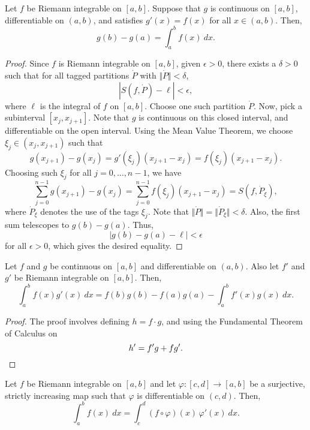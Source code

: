 \documentclass[11pt]{article}
\theoremstyle{definition}
\theoremstyle{remark}
\numberwithin{equation}{module}
\begin{document}
    \begin{theorem}
        Let $f$ be Riemann integrable on $[a, b]$. Suppose that $g$ is continuous on
        $[a, b]$, differentiable on $(a, b)$, and satisfies $g'(x) = f(x)$ for all
        $x \in (a, b)$. Then, \[
            g(b) - g(a) = \int_a^b f(x)\:dx.
        \] 
    \end{theorem}
    \begin{proof}
        Since $f$ is Riemann integrable on $[a, b]$, given $\epsilon > 0$, there
        exists a $\delta > 0$ such that for all tagged partitions $\dot{P}$ with
        $\Vert\dot{P}\Vert < \delta$, \[
            |S(f, \dot{P}) - \ell| < \epsilon,
        \] where $\ell$ is the integral of $f$ on $[a, b]$. Choose one such
        partition $\dot{P}$. Now, pick a subinterval $[x_j, x_{j + 1}]$. Note that
        $g$ is continuous on this closed interval, and differentiable on the open
        interval. Using the Mean Value Theorem, we choose $\xi_j \in (x_j, x_{j +
        1})$ such that \[
            g(x_{j + 1}) - g(x_j) = g'(\xi_j)(x_{j + 1} - x_j) = f(\xi_j)(x_{j + 1}
            - x_j).
        \] Choosing such $\xi_j$ for all $j = 0, \dots, n - 1$, we have \[
            \sum_{j = 0}^{n - 1}g(x_{j + 1}) - g(x_j) = \sum_{j = 0}^{n - 1}
            f(\xi_j)(x_{j + 1} - x_j) = S(f, \dot{P}_\xi),
        \] where $\dot{P}_\xi$ denotes the use of the tags $\xi_j$. Note that
        $\Vert\dot{P}\Vert = \Vert\dot{P}_\xi\Vert < \delta$. Also, the first sum
        telescopes to $g(b) - g(a)$. Thus, \[
            |g(b) - g(a) - \ell| < \epsilon
        \] for all $\epsilon > 0$, which gives the desired equality.
    \end{proof}

    \begin{theorem}
        Let $f$ and $g$ be continuous on $[a, b]$ and differentiable on $(a, b)$.
        Also let $f'$ and $g'$ be Riemann integrable on $[a, b]$. Then, \[
            \int_a^b f(x)g'(x)\:dx = f(b)g(b) - f(a)g(a) - \int_a^b f'(x)g(x)\:dx.
        \] 
    \end{theorem}
    \begin{proof}
        The proof involves defining $h = f\cdot g$, and using the Fundamental
        Theorem of Calculus on \[
            h' = f'g + fg'. \qedhere
        \] 
    \end{proof}

    \begin{theorem}
        Let $f$ be Riemann integrable on $[a, b]$ and let $\varphi\colon [c, d] \to
        [a, b]$ be a surjective, strictly increasing map such that $\varphi$ is
        differentiable on $(c, d)$. Then, \[
            \int_a^b f(x)\:dx = \int_c^d (f\circ\varphi)(x)\,\varphi'(x)\:dx.
        \] 
    \end{theorem}
\end{document}
